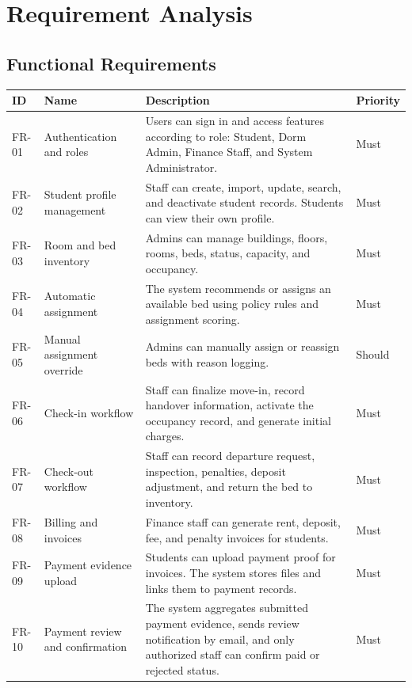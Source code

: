 \documentclass[11pt,a4paper]{article}
\begin{document}
\section{Requirement Analysis}

\subsection{Functional Requirements}

\begin{longtable}{L{0.11\textwidth} L{0.19\textwidth} L{0.45\textwidth} L{0.10\textwidth}}
\toprule
\textbf{ID} & \textbf{Name} & \textbf{Description} & \textbf{Priority}\\
\midrule
\endhead
FR-01 & Authentication and roles & Users can sign in and access features according to role: Student, Dorm Admin, Finance Staff, and System Administrator. & Must\\
FR-02 & Student profile management & Staff can create, import, update, search, and deactivate student records. Students can view their own profile. & Must\\
FR-03 & Room and bed inventory & Admins can manage buildings, floors, rooms, beds, status, capacity, and occupancy. & Must\\
FR-04 & Automatic assignment & The system recommends or assigns an available bed using policy rules and assignment scoring. & Must\\
FR-05 & Manual assignment override & Admins can manually assign or reassign beds with reason logging. & Should\\
FR-06 & Check-in workflow & Staff can finalize move-in, record handover information, activate the occupancy record, and generate initial charges. & Must\\
FR-07 & Check-out workflow & Staff can record departure request, inspection, penalties, deposit adjustment, and return the bed to inventory. & Must\\
FR-08 & Billing and invoices & Finance staff can generate rent, deposit, fee, and penalty invoices for students. & Must\\
FR-09 & Payment evidence upload & Students can upload payment proof for invoices. The system stores files and links them to payment records. & Must\\
FR-10 & Payment review and confirmation & The system aggregates submitted payment evidence, sends review notification by email, and only authorized staff can confirm paid or rejected status. & Must\\

\end{longtable}
\end{document}
